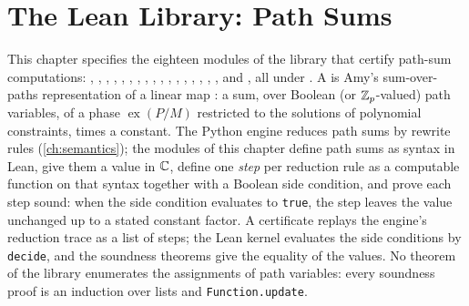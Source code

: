 \chapter{The Lean Library: Path Sums}\label{ch:lean-pathsum}
\begingroup\sloppy

This chapter specifies the eighteen modules of the  library
\cite{demoura2021lean4} that certify path-sum computations: , ,
, , , , ,
, , , ,
, , , ,
, , and , all under . A  is
Amy's sum-over-paths representation of a linear map \cite{amy2018pathsums,vilmart2021sop}: a sum,
over Boolean (or $\mathbb{Z}_{p}$-valued) path variables, of a phase $\operatorname{ex}(P/M)$ restricted to
the solutions of polynomial constraints, times a constant. The Python engine reduces path sums by
rewrite rules (\cref{ch:semantics}); the modules of this chapter define path sums as syntax in
Lean, give them a value in $\mathbb{C}$, define one \emph{step} per reduction rule as a computable
function on that syntax together with a Boolean side condition, and prove each step sound: when the
side condition evaluates to \textnormal{\texttt{true}}, the step leaves the value unchanged up to a stated
constant factor. A certificate replays the engine's reduction trace as a list of steps; the Lean
kernel evaluates the side conditions by \textnormal{\texttt{decide}}, and the soundness theorems give the equality
of the values. No theorem of the library enumerates the assignments of path variables: every
soundness proof is an induction over lists and \textnormal{\texttt{Function.\allowbreak{}update}}.

